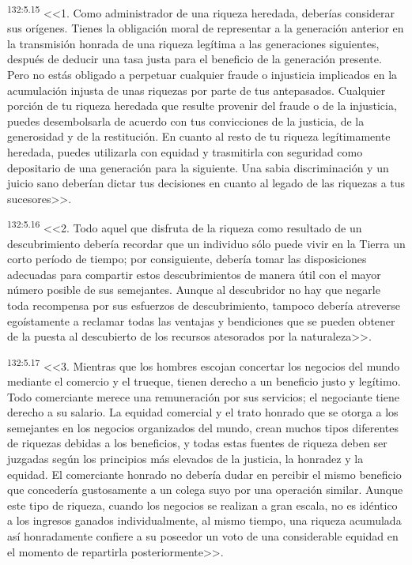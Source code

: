 \par 
\textsuperscript{132:5.15} <<1. Como administrador de una riqueza heredada, deberías considerar sus orígenes. Tienes la obligación moral de representar a la generación anterior en la transmisión honrada de una riqueza legítima a las generaciones siguientes, después de deducir una tasa justa para el beneficio de la generación presente. Pero no estás obligado a perpetuar cualquier fraude o injusticia implicados en la acumulación injusta de unas riquezas por parte de tus antepasados. Cualquier porción de tu riqueza heredada que resulte provenir del fraude o de la injusticia, puedes desembolsarla de acuerdo con tus convicciones de la justicia, de la generosidad y de la restitución. En cuanto al resto de tu riqueza legítimamente heredada, puedes utilizarla con equidad y trasmitirla con seguridad como depositario de una generación para la siguiente. Una sabia discriminación y un juicio sano deberían dictar tus decisiones en cuanto al legado de las riquezas a tus sucesores>>.

\par 
\textsuperscript{132:5.16} <<2. Todo aquel que disfruta de la riqueza como resultado de un descubrimiento debería recordar que un individuo sólo puede vivir en la Tierra un corto período de tiempo; por consiguiente, debería tomar las disposiciones adecuadas para compartir estos descubrimientos de manera útil con el mayor número posible de sus semejantes. Aunque al descubridor no hay que negarle toda recompensa por sus esfuerzos de descubrimiento, tampoco debería atreverse egoístamente a reclamar todas las ventajas y bendiciones que se pueden obtener de la puesta al descubierto de los recursos atesorados por la naturaleza>>.

\par 
\textsuperscript{132:5.17} <<3. Mientras que los hombres escojan concertar los negocios del mundo mediante el comercio y el trueque, tienen derecho a un beneficio justo y legítimo. Todo comerciante merece una remuneración por sus servicios; el negociante tiene derecho a su salario. La equidad comercial y el trato honrado que se otorga a los semejantes en los negocios organizados del mundo, crean muchos tipos diferentes de riquezas debidas a los beneficios, y todas estas fuentes de riqueza deben ser juzgadas según los principios más elevados de la justicia, la honradez y la equidad. El comerciante honrado no debería dudar en percibir el mismo beneficio que concedería gustosamente a un colega suyo por una operación similar. Aunque este tipo de riqueza, cuando los negocios se realizan a gran escala, no es idéntico a los ingresos ganados individualmente, al mismo tiempo, una riqueza acumulada así honradamente confiere a su poseedor un voto de una considerable equidad en el momento de repartirla posteriormente>>.


